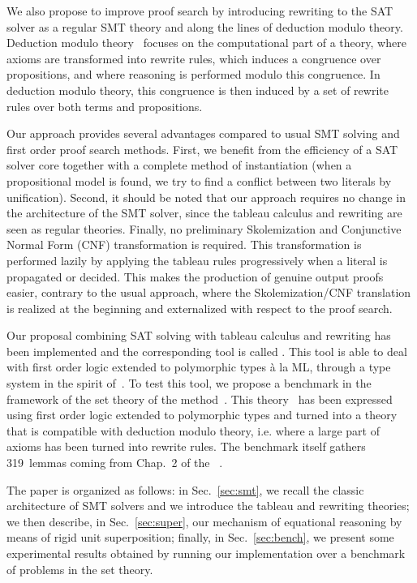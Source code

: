 We also propose to improve proof search by introducing rewriting to the SAT
solver as a regular SMT theory and along the lines of deduction modulo
theory. Deduction modulo theory~\cite{DA03} focuses on the computational part of
a theory, where axioms are transformed into rewrite rules, which induces a
congruence over propositions, and where reasoning is performed modulo this
congruence. In deduction modulo theory, this congruence is then induced by a set
of rewrite rules over both terms and propositions.

Our approach provides several advantages compared to usual SMT solving and first
order proof search methods. First, we benefit from the efficiency of a SAT
solver core together with a complete method of instantiation (when a
propositional model is found, we try to find a conflict between two literals by
unification). Second, it should be noted that our approach requires no change in
the architecture of the SMT solver, since the tableau calculus and rewriting are
seen as regular theories. Finally, no preliminary Skolemization and Conjunctive
Normal Form (CNF) transformation is required. This transformation is performed
lazily by applying the tableau rules progressively when a literal is propagated
or decided. This makes the production of genuine output proofs easier, contrary
to the usual approach, where the Skolemization/CNF translation is realized at
the beginning and externalized with respect to the proof search.

Our proposal combining SAT solving with tableau calculus and rewriting has been
implemented and the corresponding tool is called \archsat{}. This tool is able
to deal with first order logic extended to polymorphic types à la ML, through a
type system in the spirit of~\cite{BP13}. To test this tool, we propose a
benchmark in the framework of the set theory of the \bmth{}
method~\cite{B-Book}. This theory~\cite{BA15} has been expressed using first
order logic extended to polymorphic types and turned into a theory that is
compatible with deduction modulo theory, i.e. where a large part of axioms has
been turned into rewrite rules. The benchmark itself gathers 319~lemmas coming
from Chap.~2 of the \bbook{}~\cite{B-Book}.

The paper is organized as follows: in Sec.~\ref{sec:smt}, we recall the classic
architecture of SMT solvers and we introduce the tableau and rewriting theories;
we then describe, in Sec.~\ref{sec:super}, our mechanism of equational reasoning
by means of rigid unit superposition; finally, in Sec.~\ref{sec:bench}, we
present some experimental results obtained by running our implementation over a
benchmark of problems in the \bmth{} set theory.
